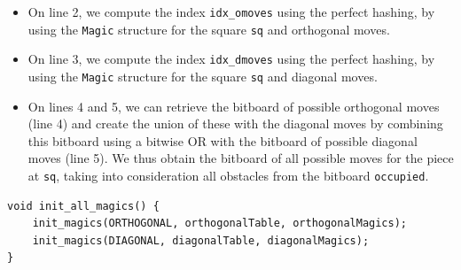 \documentclass[12pt,a4paper,twoside,openright]{book}
\begin{document}
\begin{itemize}
\item On line 2, we compute the index \texttt{idx_omoves} using the perfect hashing, by using the \texttt{Magic} structure for the square \texttt{sq} and orthogonal moves.

\item On line 3, we compute the index \texttt{idx_dmoves} using the perfect hashing, by using the \texttt{Magic} structure for the square \texttt{sq} and diagonal moves.

\item On lines 4 and 5, we can retrieve the bitboard of possible orthogonal moves (line 4) and create the union of these with the diagonal moves by combining this bitboard using a bitwise OR with the bitboard of possible diagonal moves (line 5). We thus obtain the bitboard of all possible moves for the piece at \texttt{sq}, taking into consideration all obstacles from the bitboard \texttt{occupied}.

\end{itemize}

\begin{mdframed}[skipabove=\baselineskip,hidealllines=true]
\begin{verbatim}
void init_all_magics() {
    init_magics(ORTHOGONAL, orthogonalTable, orthogonalMagics);
    init_magics(DIAGONAL, diagonalTable, diagonalMagics);
}
\end{verbatim}
\label{lst:magic_init}
\end{mdframed}
\end{document}
